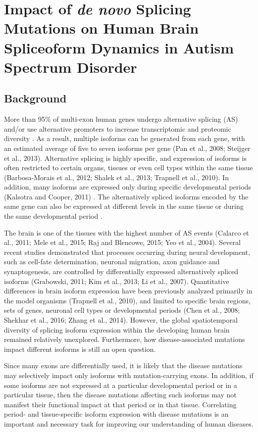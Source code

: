 \chapter{Impact of \textit{de novo} Splicing Mutations on Human Brain Spliceoform Dynamics in Autism Spectrum Disorder}
\section{Background}

More than 95\% of multi-exon human genes undergo alternative splicing (AS) and/or use alternative promoters to increase transcriptomic and proteomic diversity  \cite{Pan2008, Wang2008} . As a result, multiple isoforms can be generated from each gene, with an estimated average of five to seven isoforms per gene (Pan et al., 2008; Steijger et al., 2013).  Alternative splicing is highly specific, and expression of isoforms is often restricted to certain organs, tissues or even cell types within the same tissue (Barbosa-Morais et al., 2012; Shalek et al., 2013; Trapnell et al., 2010). In addition, many isoforms are expressed only during specific developmental periods (Kalsotra and Cooper, 2011) . The alternatively spliced isoforms encoded by the same gene can also be expressed at different levels in the same tissue or during the same developmental period \cite{Wang2008} .

The brain is one of the tissues with the highest number of AS events (Calarco et al., 2011; Mele et al., 2015; Raj and Blencowe, 2015; Yeo et al., 2004). Several recent studies demonstrated that processes occurring during neural development, such as cell-fate determination, neuronal migration, axon guidance and synaptogenesis, are controlled by differentially expressed alternatively spliced isoforms (Grabowski, 2011; Kim et al., 2013; Li et al., 2007). Quantitative differences in brain isoform expression have been previously analyzed primarily in the model organisms (Trapnell et al., 2010), and limited to specific brain regions, sets of genes, neuronal cell types or developmental periods (Chen et al., 2008; Shekhar et al., 2016; Zhang et al., 2014). However, the global spatiotemporal diversity of splicing isoform expression within the developing human brain remained relatively unexplored. Furthermore, how disease-associated mutations impact different isoforms is still an open question.

Since many exons are differentially used, it is likely that the disease mutations may selectively impact only isoforms with mutation-carrying exons. In addition, if some isoforms are not expressed at a particular developmental period or in a particular tissue, then the disease mutations affecting such isoforms may not manifest their functional impact at that period or in that tissue. Correlating period- and tissue-specific isoform expression with disease mutations is an important and necessary task for improving our understanding of human diseases.

